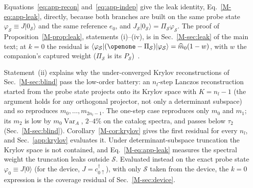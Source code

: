 \documentclass[aps,prb,onecolumn,superscriptaddress,longbibliography,floatfix]{revtex4-2}
\begin{document}
Equations~\eqref{eq:app-recon} and~\eqref{eq:app-indep} give the leak identity, Eq.~\eqref{M-eq:app-leak}, directly, because both branches are built on the same probe state $\varphi_\mathcal{S}\equiv J|0_\mathcal{S}\rangle$ and the same reference $e_0$, and $J_\mathcal S|0_\mathcal S\rangle=\Pi_\mathcal S\varphi_\mathcal S$. The proof of Proposition~\ref{M-prop:leak}, statements (i)--(iv), is in Sec.~\ref{M-sec:leak} of the main text; at $k=0$ the residual is ${\langle\varphi_\mathcal{S}|(\openone-\Pi_\mathcal{S})|\varphi_\mathcal{S}\rangle=\widehat m_0(1-w)}$, with $w$ the companion's captured weight ($\Pi_\mathcal{S}$ is its $P_\mathcal{S}$)~\cite{SQDspec2608}.

Statement~(ii) explains why the under-converged Krylov reconstructions of Sec.~\ref{M-sec:blind} pass the low-order battery: an $n_l$-step Lanczos reconstruction started from the probe state projects onto its Krylov space with $K=n_l-1$ (the argument holds for any orthogonal projector, not only a determinant subspace) and so reproduces $m_0,\dots,m_{2n_l-1}$. The one-step case reproduces only $m_0$ and $m_1$; its $m_2$ is low by $m_0\operatorname{Var}_A$, $2$--$4\%$ on the catalog spectra, and passes below $\tau_2$ (Sec.~\ref{M-sec:blind}). Corollary~\ref{M-cor:krylov} gives the first residual for every $n_l$, and Sec.~\ref{app:krylov} evaluates it. Under determinant-subspace truncation the Krylov space is not contained, and Eq.~\eqref{M-eq:app-leak} measures the spectral weight the truncation leaks outside $\mathcal{S}$. Evaluated instead on the exact probe state $\varphi_0\equiv J|0\rangle$ (for the device, $J=c^\dagger_{0\uparrow}$), with only $\mathcal{S}$ taken from the device, the $k=0$ expression is the coverage residual of Sec.~\ref{M-sec:device}.
\end{document}
